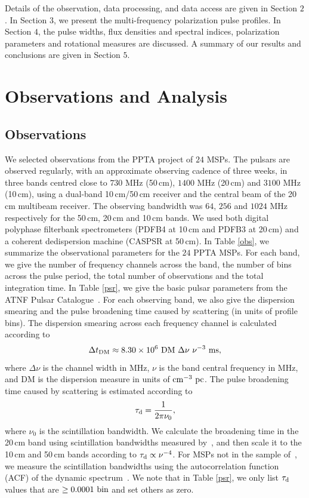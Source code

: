 \documentclass[useAMS,usenatbib]{mn2e}
\begin{document}
Details of the observation, data processing, and data access are given in 
Section $2$. 
%
In Section $3$, we present the multi-frequency polarization pulse profiles.
%
In Section $4$, the pulse widths, flux densities and spectral 
indices, polarization parameters and rotational measures are discussed. 
%
A summary of our results and conclusions are given in Section $5$.


\section{Observations and Analysis}

\subsection{Observations}

We selected observations from the PPTA project of $24$ MSPs. 
%
The pulsars are observed regularly, with an approximate observing cadence of 
three weeks, in three bands centred close to $730$ MHz (50\,cm), $1400$ MHz (20\,cm) and $3100$ MHz (10\,cm), 
using a dual-band 10\,cm/50\,cm receiver and the central beam 
of the 20\,cm multibeam receiver. The observing 
bandwidth was $64$, $256$ and $1024$ MHz respectively for the 50\,cm, 20\,cm 
and 10\,cm bands. 
%
We used both digital polyphase filterbank spectrometers (PDFB4 at 10\,cm 
and PDFB3 at 20\,cm) and a coherent dedispersion machine (CASPSR at 50\,cm). 
%
In Table \ref{obs}, we summarize the observational parameters for the $24$ PPTA MSPs. 
%
For each band, we give the number of frequency channels across 
the band, the number of bins across the pulse period, the total number 
of observations and the total integration time.
%
In Table \ref{psr}, we give the basic pulsar parameters from the ATNF Pulsar 
Catalogue~\citep{Manchester05}.
%
For each observing band, we also give the dispersion smearing and the pulse 
broadening time caused by scattering (in units of profile bins).
%
The dispersion smearing across each frequency channel is calculated according to
%
\begin{equation}
\Delta t_{\rm{DM}}\approx 8.30 \times 10^{6}\ \rm{DM}\ \Delta \nu\ \nu^{-3}\ \rm{ms},
\label{dm}
\end{equation}
%
where $\Delta \nu$ is the channel width in MHz, $\nu$ is the band central frequency in MHz, 
and DM is the dispersion measure in units of $\rm{cm^{-3}\ pc}$.
%
The pulse broadening time caused by scattering is estimated according to
%
\begin{equation}
\tau_{\rm{d}} = \frac{1}{2\pi\nu_0},
\end{equation}
%
where $\nu_0$ is the scintillation bandwidth. We calculate the broadening time 
in the 20\,cm band using scintillation bandwidths measured by~\citet{Keith13}, and 
then scale it to the 10\,cm and 50\,cm bands according to $\tau_{\rm{d}}\propto\nu^{-4}$.
For MSPs not in the sample of~\citet{Keith13}, we measure the scintillation 
bandwidths using the autocorrelation function (ACF) of the dynamic spectrum~\citep[e.g.,][]{Wang05}.
%
We note that in Table \ref{psr}, we only list $\tau_{\rm{d}}$ values that are 
$\ge 0.0001\ \rm{bin}$ and set others as zero.
\end{document}
